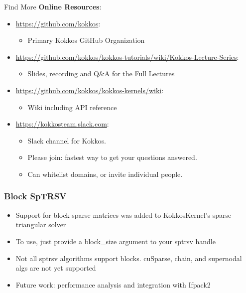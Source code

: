 \begin{frame}{Find More}
\textbf{Online Resources}:
\begin{itemize}
        \item \url{https://github.com/kokkos}:
                \begin{itemize}
                        \item Primary Kokkos GitHub Organization
                \end{itemize}
        \item \url{https://github.com/kokkos/kokkos-tutorials/wiki/Kokkos-Lecture-Series}:
                \begin{itemize}
			\item{Slides, recording and Q\&A for the Full Lectures}
                \end{itemize}
        \item \url{https://github.com/kokkos/kokkos-kernels/wiki}:
                \begin{itemize}
                        \item Wiki including API reference
                \end{itemize}
        \item \url{https://kokkosteam.slack.com}:
                \begin{itemize}
                        \item Slack channel for Kokkos.
                        \item Please join: fastest way to get your questions answered.
                        \item Can whitelist domains, or invite individual people.
                \end{itemize}
\end{itemize}
\end{frame}

\begin{frame}
\frametitle{Block SpTRSV}
    \begin{itemize}
      \item{Support for block sparse matrices was added to KokkosKernel's sparse triangular solver}
      \item{To use, just provide a block\_size argument to your sptrsv handle}
      \item{Not all sptrsv algorithms support blocks. cuSparse, chain, and supernodal algs are not yet supported}
      \item{Future work: performance analysis and integration with Ifpack2}
    \end{itemize}
\end{frame}

